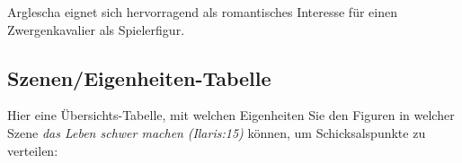 Arglescha eignet sich hervorragend als romantisches Interesse für einen Zwergenkavalier als Spielerfigur.

\spaltenende
\begin{center}
\end{center}

\newpage
\subsection{Szenen/Eigenheiten-Tabelle}
Hier eine Übersichts-Tabelle, mit welchen Eigenheiten Sie den Figuren in welcher Szene \emph{das Leben schwer machen} \emph{(Ilaris:15)} können, um Schicksalspunkte zu verteilen:

